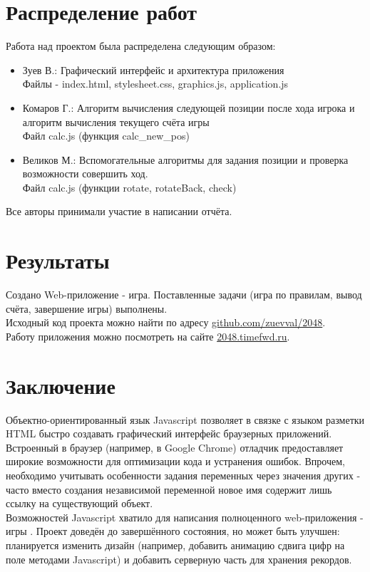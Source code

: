 \documentclass[a4paper,12pt]{article}
\newcommand{\lk}{\guillemotleft}
\newcommand{\rk}{\guillemotright}
\begin{document}
\section{Распределение работ}
Работа над проектом была распределена следующим образом:
\begin{itemize}
\item{Зуев В.:} Графический интерфейс и архитектура приложения\\
Файлы - index.html, stylesheet.css, graphics.js, application.js
\item{Комаров Г.:} Алгоритм вычисления следующей позиции после хода игрока и алгоритм вычисления текущего счёта игры\\
Файл calc.js (функция calc\_new\_pos)
\item{Великов М.:} Вспомогательные алгоритмы для задания позиции и проверка возможности совершить ход.\\
Файл calc.js (функции rotate, rotateBack, check)
\end{itemize}
Все авторы принимали участие в написании отчёта.
\section{Результаты}
Создано Web-приложение - игра. Поставленные задачи (игра по правилам, вывод счёта, завершение игры) выполнены.\\
Исходный код проекта можно найти по адресу \href{https://github.com/zuevval/2048}{github.com/zuevval/2048}.\\
Работу приложения можно посмотреть на сайте \href{http://2048.timefwd.ru}{2048.timefwd.ru}.
\section{Заключение}
Объектно-ориентированный язык Javascript позволяет в связке с языком разметки HTML быстро создавать графический интерфейс браузерных приложений. Встроенный в браузер (например, в  Google Chrome) отладчик предоставляет широкие возможности для оптимизации кода и устранения ошибок. Впрочем, необходимо учитывать особенности задания переменных через значения других - часто вместо создания независимой переменной новое имя содержит лишь ссылку на существующий объект.\\
Возможностей Javascript хватило для написания полноценного web-\-при\-ло\-жения - игры \lk2048\rk. Проект доведён до завершённого состояния, но может быть улучшен: планируется изменить дизайн (например, добавить анимацию сдвига цифр на поле методами Javascript) и добавить серверную часть для хранения рекордов.
\end{document}
